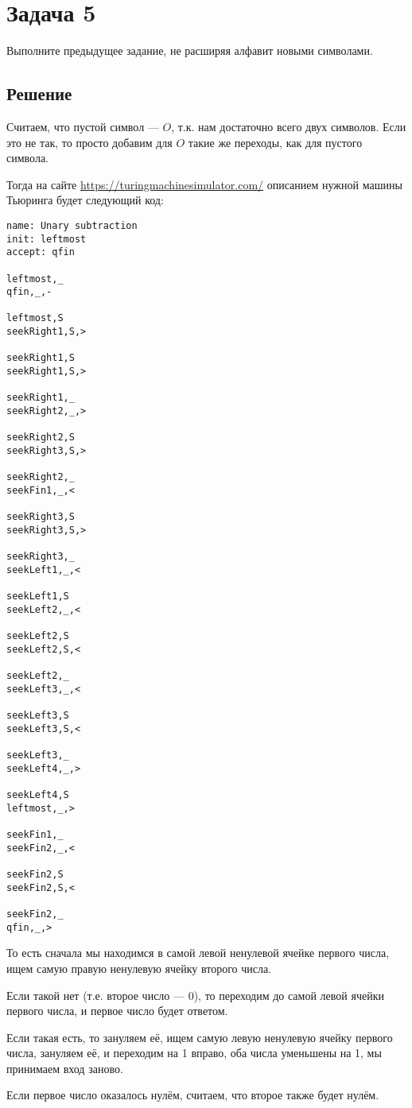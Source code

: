 \section{Задача 5}
Выполните предыдущее задание, не расширяя алфавит новыми символами.

\subsection{Решение}
Считаем, что пустой символ --- $O$, т.к.
нам достаточно всего двух символов.
Если это не так, то просто добавим для $O$
такие же переходы, как для пустого символа.

Тогда на сайте \url{https://turingmachinesimulator.com/}
описанием нужной машины Тьюринга будет следующий код:
\begin{verbatim}
name: Unary subtraction
init: leftmost
accept: qfin

leftmost,_
qfin,_,-

leftmost,S
seekRight1,S,>

seekRight1,S
seekRight1,S,>

seekRight1,_
seekRight2,_,>

seekRight2,S
seekRight3,S,>

seekRight2,_
seekFin1,_,<

seekRight3,S
seekRight3,S,>

seekRight3,_
seekLeft1,_,<

seekLeft1,S
seekLeft2,_,<

seekLeft2,S
seekLeft2,S,<

seekLeft2,_
seekLeft3,_,<

seekLeft3,S
seekLeft3,S,<

seekLeft3,_
seekLeft4,_,>

seekLeft4,S
leftmost,_,>

seekFin1,_
seekFin2,_,<

seekFin2,S
seekFin2,S,<

seekFin2,_
qfin,_,>
\end{verbatim}

То есть сначала мы находимся в самой левой ненулевой ячейке первого числа,
ищем самую правую ненулевую ячейку второго числа.

Если такой нет (т.е. второе число --- 0),
то переходим до самой левой ячейки первого
числа, и первое число будет ответом.

Если такая есть, то зануляем её, ищем самую левую ненулевую
ячейку первого числа, зануляем её, и переходим на 1 вправо,
оба числа уменьшены на 1, мы принимаем вход заново.

Если первое число оказалось нулём, считаем,
что второе также будет нулём.
